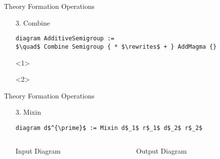 \documentclass[t,12pt,numbers,fleqn,usenames,xcolor=dvipsnames]{beamer}
\begin{document}
\begin{frame}[fragile]{Theory Formation Operations}
\begin{enumerate}
	\item[3.] Combine
	\scriptsize
	\begin{lstlisting}
diagram AdditiveSemigroup := 
$\quad$ Combine Semigroup { * $\rewrites$ + } AddMagma {} 
	\end{lstlisting}
\begin{onlyenv}<1>		
	\scriptsize	
\end{onlyenv}
\begin{onlyenv}<2>
\end{onlyenv}
\end{enumerate}		
\end{frame}

\begin{frame}[fragile]{Theory Formation Operations}
	\begin{enumerate}
		\item[3.] Mixin 	
\scriptsize		
		\begin{lstlisting}
diagram d$^{\prime}$ := Mixin d$_1$ r$_1$ d$_2$ r$_2$ 
		\end{lstlisting}
\begin{columns}
\begin{column}{0.45\textwidth}
	\begin{block}{\footnotesize Input Diagram}
		\scriptsize	
	\end{block}				
\end{column}
\begin{column}{0.45\textwidth}
	\begin{block}{\footnotesize Output Diagram}
		\scriptsize		
	\end{block}
\end{column}
\end{columns}
\end{enumerate}	
\end{frame}
\end{document}
